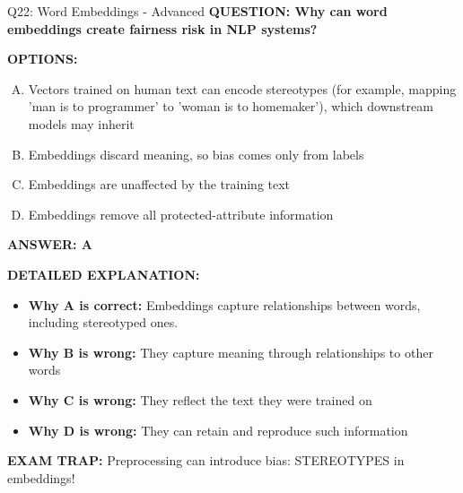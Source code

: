 \documentclass[8pt]{beamer}
\begin{document}
\begin{frame}[shrink=6]{Q22: Word Embeddings - Advanced}
\fontsize{6.5}{7.5}\selectfont
\textbf{QUESTION: Why can word embeddings create fairness risk in NLP systems?}

\vspace{0.1cm}
\textbf{OPTIONS:}
\begin{enumerate}[A.]
\item Vectors trained on human text can encode stereotypes (for example, mapping 'man is to programmer' to 'woman is to homemaker'), which downstream models may inherit
\item Embeddings discard meaning, so bias comes only from labels
\item Embeddings are unaffected by the training text
\item Embeddings remove all protected-attribute information
\end{enumerate}

\vspace{0.1cm}
\textcolor{myblue}{\textbf{ANSWER: A}}

\vspace{0.1cm}
\textbf{DETAILED EXPLANATION:}
\begin{itemize}
\item \textbf{Why A is correct:} Embeddings capture relationships between words, including stereotyped ones.
\item \textbf{Why B is wrong:} They capture meaning through relationships to other words
\item \textbf{Why C is wrong:} They reflect the text they were trained on
\item \textbf{Why D is wrong:} They can retain and reproduce such information
\end{itemize}

\textcolor{myred}{\textbf{EXAM TRAP:}} Preprocessing can introduce bias: STEREOTYPES in embeddings!
\end{frame}
\end{document}
